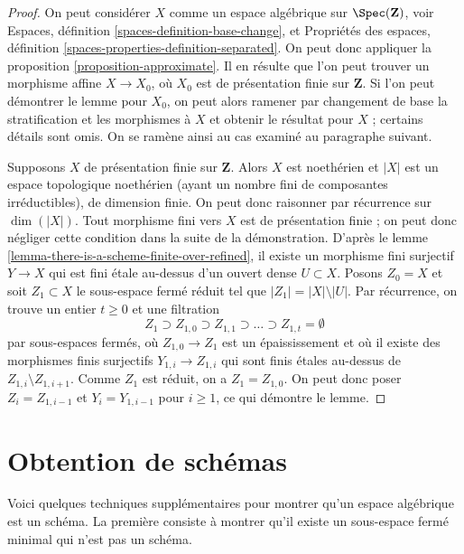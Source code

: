 \begin{proof}
On peut considérer $X$ comme un espace algébrique sur $\Spec(\mathbf{Z})$, voir
Espaces, définition \ref{spaces-definition-base-change}, et
Propriétés des espaces, définition \ref{spaces-properties-definition-separated}.
On peut donc appliquer la proposition \ref{proposition-approximate}.
Il en résulte que l'on peut trouver un morphisme affine $X \to X_0$,
où $X_0$ est de présentation finie sur $\mathbf{Z}$.
Si l'on peut démontrer le lemme pour $X_0$, on peut alors ramener par changement de base
la stratification et les morphismes à $X$ et obtenir le résultat pour $X$ ;
certains détails sont omis. On se ramène ainsi au cas examiné au
paragraphe suivant.

\medskip\noindent
Supposons $X$ de présentation finie sur $\mathbf{Z}$.
Alors $X$ est noethérien et $|X|$ est un espace topologique
noethérien (ayant un nombre fini de composantes irréductibles), de dimension finie.
On peut donc raisonner par récurrence sur $\dim(|X|)$.
Tout morphisme fini vers $X$ est de présentation finie ;
on peut donc négliger cette condition dans la suite de la démonstration.
D'après le lemme \ref{lemma-there-is-a-scheme-finite-over-refined},
il existe un morphisme fini surjectif $Y \to X$ qui est
fini étale au-dessus d'un ouvert dense $U \subset X$.
Posons $Z_0 = X$ et soit $Z_1 \subset X$ le sous-espace fermé réduit
tel que $|Z_1| = |X| \setminus |U|$.
Par récurrence, on trouve un entier $t \geq 0$ et une filtration
$$
Z_1 \supset Z_{1, 0} \supset Z_{1, 1} \supset \ldots
\supset Z_{1, t} = \emptyset
$$
par sous-espaces fermés, où $Z_{1, 0} \to Z_1$ est un épaississement
et où il existe des morphismes finis surjectifs $Y_{1, i} \to Z_{1, i}$
qui sont finis étales au-dessus de $Z_{1, i} \setminus Z_{1, i + 1}$.
Comme $Z_1$ est réduit, on a $Z_1 = Z_{1, 0}$.
On peut donc poser $Z_i = Z_{1, i - 1}$ et $Y_i = Y_{1, i - 1}$
pour $i \geq 1$, ce qui démontre le lemme.
\end{proof}











\section{Obtention de schémas}
\label{section-representable}

\noindent
Voici quelques techniques supplémentaires pour montrer qu'un espace algébrique est un schéma.
La première consiste à montrer qu'il existe un sous-espace fermé minimal
qui n'est pas un schéma.

